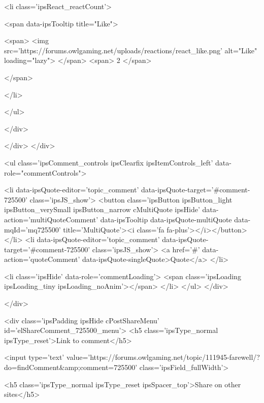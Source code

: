 		
			
				
				<li class='ipsReact_reactCount'>
					
						<span data-ipsTooltip title="Like">
					
							<span>
								<img src='https://forums.owlgaming.net/uploads/reactions/react_like.png' alt="Like" loading="lazy">
							</span>
							<span>
								2
							</span>
					
						</span>
					
				</li>
			
		
	</ul>

					
				</div>
			
			
			
		</div>
	</div>

					
				
				<ul class='ipsComment_controls ipsClearfix ipsItemControls_left' data-role="commentControls">
					
						
							<li data-ipsQuote-editor='topic_comment' data-ipsQuote-target='#comment-725500' class='ipsJS_show'>
								<button class='ipsButton ipsButton_light ipsButton_verySmall ipsButton_narrow cMultiQuote ipsHide' data-action='multiQuoteComment' data-ipsTooltip data-ipsQuote-multiQuote data-mqId='mq725500' title='MultiQuote'><i class='fa fa-plus'></i></button>
							</li>
							<li data-ipsQuote-editor='topic_comment' data-ipsQuote-target='#comment-725500' class='ipsJS_show'>
								<a href='#' data-action='quoteComment' data-ipsQuote-singleQuote>Quote</a>
							</li>
						
						
						
					
					<li class='ipsHide' data-role='commentLoading'>
						<span class='ipsLoading ipsLoading_tiny ipsLoading_noAnim'></span>
					</li>
				</ul>
			</div>
		

		
	</div>

	

	



<div class='ipsPadding ipsHide cPostShareMenu' id='elShareComment_725500_menu'>
	<h5 class='ipsType_normal ipsType_reset'>Link to comment</h5>
	
		
	
	
	<input type='text' value='https://forums.owlgaming.net/topic/111945-farewell/?do=findComment&amp;comment=725500' class='ipsField_fullWidth'>

	
	<h5 class='ipsType_normal ipsType_reset ipsSpacer_top'>Share on other sites</h5>
	

